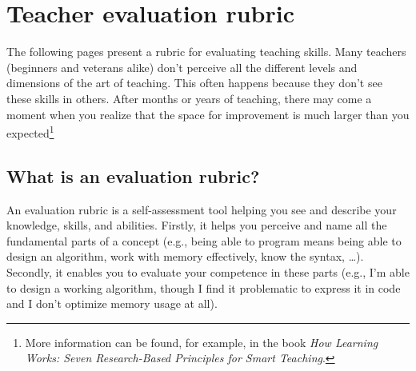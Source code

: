 
\newcommand{\rubriccriterion}[4]{
\stepcounter{rubricquestion}
\section*{\therubricquestion: #1}

\smallskip
\note{Unaware:} #2

\note{Beginner:} #3

\note{Guru:} #4

\medskip
\begin{tikzpicture}
\draw (0,0) -- (8,0);
\foreach \i in {0,1,...,8} %
{
\fill[black] (\i,0) circle (1.5 mm);
\fill[white] (\i,0) circle (1.4 mm);
}
\node at (0.15, -0.5) {unaware};
\node at (3, -0.5)    {beginner};
\node at (8, -0.5)    {guru};
\end{tikzpicture}
}

\restoregeometry
\chapter*{Teacher evaluation rubric}
\label{rubric}

The following pages present a rubric for evaluating teaching skills. Many teachers (beginners and veterans alike) don't perceive all the different levels and dimensions of the art of teaching. This often happens because they don't see these skills in others. After months or years of teaching, there may come a moment when you realize that the space for improvement is much larger than you expected\footnote{More information can be found, for example, in the book \emph{How Learning Works: Seven Research-Based Principles for Smart Teaching}.}

\section*{What is an evaluation rubric?}

An evaluation rubric is a self-assessment tool helping you see and describe your knowledge, skills, and abilities. Firstly, it helps you perceive and name all the fundamental parts of a concept (e.g., being able to program means being able to design an algorithm, work with memory effectively, know the syntax, \dots). Secondly, it enables you to evaluate your competence in these parts (e.g., I'm able to design a working algorithm, though I find it problematic to express it in code and I don't optimize memory usage at all).


